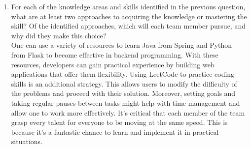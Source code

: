 \documentclass[12pt, titlepage]{article}
\begin{document}
\begin{enumerate}
  \item For each of the knowledge areas and skills identified in the previous question, what are at least two approaches to acquiring the knowledge or mastering the skill?  Of the identified approaches, which will each team member pursue, and why did they make this choice?\\
  One can use a variety of resources to learn Java from Spring and Python from Flask to become effective in backend programming. With these resources, developers can gain practical experience by building web applications that offer them flexibility. Using LeetCode to practice coding skills is an additional strategy. This allows users to modify the difficulty of the problems and proceed with their solution. Moreover, setting goals and taking regular pauses between tasks might help with time management and allow one to work more effectively. It’s critical that each member of the team grasp every talent for everyone to be moving at the same speed. This is because it’s a fantastic chance to learn and implement it in practical situations.
\end{enumerate}
\end{document}
